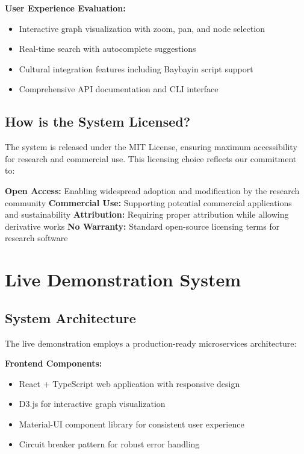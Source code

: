 \documentclass[11pt]{article}
\begin{document}
\textbf{User Experience Evaluation:}
\begin{itemize}
    \item Interactive graph visualization with zoom, pan, and node selection
    \item Real-time search with autocomplete suggestions
    \item Cultural integration features including Baybayin script support
    \item Comprehensive API documentation and CLI interface
\end{itemize}

\subsection{How is the System Licensed?}

The system is released under the MIT License, ensuring maximum accessibility for research and commercial use. This licensing choice reflects our commitment to:

\textbf{Open Access:} Enabling widespread adoption and modification by the research community
\textbf{Commercial Use:} Supporting potential commercial applications and sustainability
\textbf{Attribution:} Requiring proper attribution while allowing derivative works
\textbf{No Warranty:} Standard open-source licensing terms for research software

\section{Live Demonstration System}

\subsection{System Architecture}

The live demonstration employs a production-ready microservices architecture:

\textbf{Frontend Components:}
\begin{itemize}
    \item React + TypeScript web application with responsive design
    \item D3.js for interactive graph visualization
    \item Material-UI component library for consistent user experience
    \item Circuit breaker pattern for robust error handling
\end{itemize}
\end{document}
